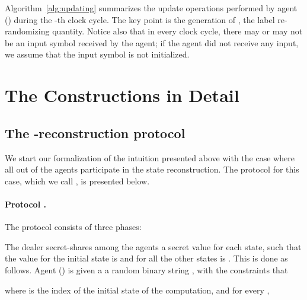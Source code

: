 \documentclass[letterpaper,11pt]{article}
\newcommand{\ignore}[1]{}
               {}
\begin{document}
Algorithm~\ref{alg:updating} 
summarizes the update operations performed by agent  () during the -th clock cycle. The key point is the generation of
, the label re-randomizing quantity. Notice also that in every
clock cycle, there may or may not be an input symbol received by the
agent; if the agent did not receive any input, we assume that the
input symbol is not initialized.



\ignore{

\todo{VLAD: I haven't gone through the algorithm. I suspect it needs some care.}

\todo{need to add text explaining that add-randomness does, depending on the instance of the protocol... what does it do?}

\todo{add-randomness is not a good name}

\todo{Juan: I tried to simplify the notation, and made add-randomness explicit. I'll probably change it further once I go over the next section.}

} 

 
\section{The Constructions in Detail}
\label{sec-from-all}

\subsection{The -reconstruction protocol \label{sec-from-all-details}}
We start our formalization of the intuition presented above with the
case where all  out of the  agents participate in the state
reconstruction.  The protocol for this case, which we call , is presented
below.

\vspace{-.1in}
\paragraph{Protocol .} The protocol consists of three phases:

\vspace{.1in}

 The dealer secret-shares among the agents 
a secret value for each state, such that the value for the initial
state is  and for all the other states is . This is done as follows. 
Agent  () is given a a random binary string
, with the constraints that 
 
where  is the index of the initial state of the
computation, and for every , 
\end{document}
